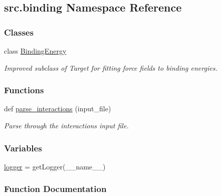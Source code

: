 \hypertarget{namespacesrc_1_1binding}{}\subsection{src.\+binding Namespace Reference}
\label{namespacesrc_1_1binding}
\subsubsection*{Classes}
\begin{DoxyCompactItemize}
\item 
class \hyperlink{classsrc_1_1binding_1_1BindingEnergy}{Binding\+Energy}
\begin{DoxyCompactList}\small\item\em Improved subclass of Target for fitting force fields to binding energies. \end{DoxyCompactList}\end{DoxyCompactItemize}
\subsubsection*{Functions}
\begin{DoxyCompactItemize}
\item 
def \hyperlink{namespacesrc_1_1binding_a79f9c8e458e824b50a4132da96c81ae7}{parse\+\_\+interactions} (input\+\_\+file)
\begin{DoxyCompactList}\small\item\em Parse through the interactions input file. \end{DoxyCompactList}\end{DoxyCompactItemize}
\subsubsection*{Variables}
\begin{DoxyCompactItemize}
\item 
\hyperlink{namespacesrc_1_1binding_ae1fc16e92024487ea1e945ff16713aae}{logger} = get\+Logger(\+\_\+\+\_\+name\+\_\+\+\_\+)
\end{DoxyCompactItemize}


\subsubsection{Function Documentation}
\mbox{\label{namespacesrc_1_1binding_a79f9c8e458e824b50a4132da96c81ae7}} 
